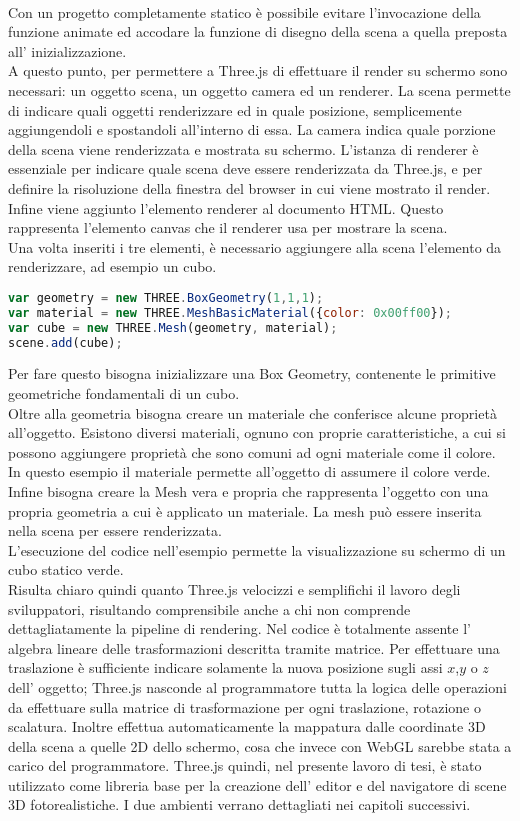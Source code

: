 \\
Con un progetto completamente statico è possibile evitare l’invocazione della funzione animate ed accodare la funzione di disegno della scena a quella preposta all’ inizializzazione.
\\
A questo punto, per permettere a Three.js di effettuare il render su schermo sono necessari: un oggetto scena, un oggetto camera ed un renderer.
La scena permette di indicare quali oggetti renderizzare ed in quale posizione, semplicemente aggiungendoli e spostandoli all’interno di essa.
La camera indica quale porzione della scena viene renderizzata e mostrata su schermo. L’istanza di renderer è essenziale per indicare quale scena deve essere renderizzata da Three.js, e per definire la risoluzione della finestra del browser in cui viene mostrato il render.
\\ 
Infine viene aggiunto l’elemento renderer al documento HTML. Questo rappresenta l’elemento canvas che il renderer usa per mostrare la scena.
\\
Una volta inseriti i tre elementi, è necessario aggiungere alla scena l’elemento da renderizzare, ad esempio un cubo.
\begin{lstlisting}[language=javascript]
var geometry = new THREE.BoxGeometry(1,1,1);
var material = new THREE.MeshBasicMaterial({color: 0x00ff00});
var cube = new THREE.Mesh(geometry, material);
scene.add(cube);
\end{lstlisting}
Per fare questo bisogna inizializzare una Box Geometry, contenente le primitive geometriche fondamentali di un cubo.
\\
Oltre alla geometria bisogna creare un materiale che conferisce alcune proprietà all’oggetto. Esistono diversi materiali, ognuno con proprie caratteristiche, a cui si possono aggiungere proprietà che sono comuni ad ogni materiale come il colore. In questo esempio il materiale permette all’oggetto di assumere il colore verde.
\\ 
Infine bisogna creare la Mesh vera e propria che rappresenta l’oggetto con una propria geometria a cui è applicato un materiale. La mesh può essere inserita nella scena per essere renderizzata.
\\
L’esecuzione del codice nell’esempio permette la visualizzazione su schermo di un cubo statico verde.
\\
Risulta chiaro quindi quanto Three.js velocizzi e semplifichi il lavoro degli sviluppatori, risultando comprensibile anche a chi non comprende dettagliatamente la pipeline di rendering. Nel codice è totalmente assente l’ algebra lineare delle trasformazioni descritta tramite matrice. Per effettuare una traslazione è sufficiente indicare solamente la nuova posizione sugli assi $x$,$y$ o $z$ dell’ oggetto; Three.js nasconde al programmatore tutta la logica delle operazioni da effettuare sulla matrice di trasformazione per ogni traslazione, rotazione o scalatura. Inoltre effettua automaticamente la mappatura dalle coordinate 3D della scena a quelle 2D dello schermo, cosa che invece con WebGL sarebbe stata a carico del programmatore.
Three.js quindi, nel presente lavoro di tesi, è stato utilizzato come libreria base per la creazione dell’ editor e del navigatore di scene 3D fotorealistiche. I due ambienti verrano dettagliati nei capitoli successivi.
